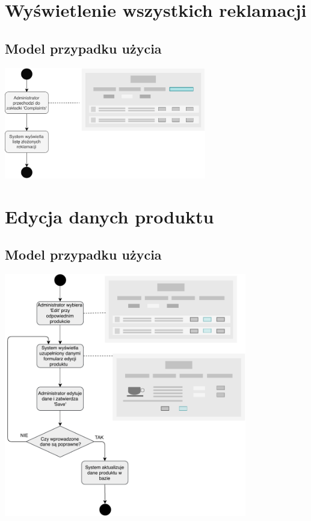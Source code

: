 \documentclass[12pt]{report}
\begin{document}
	
	\section{Wyświetlenie wszystkich reklamacji}
		\subsection{Model przypadku użycia}
			\begin{center}
				\includegraphics[width=250pt]{reklamacje.pdf}
			\end{center}
	
	
	\section{Edycja danych produktu}
		\subsection{Model przypadku użycia}
			\begin{center}
				\includegraphics[width=300pt]{edytuj_admin.pdf}
			\end{center}
		
\end{document}
